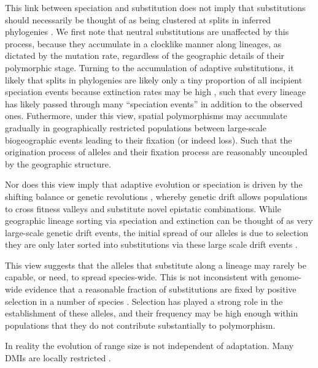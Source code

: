 \documentclass{article}
\begin{document}
This link between speciation and substitution does not imply that
substitutions should necessarily be thought of as being clustered at splits in inferred phylogenies 
\citep[see ][for a recent exhange on this]{Pennell:14,Venditti:14,Pennell:14B}. 
We first note that neutral substitutions are unaffected by this process, 
because they accumulate in a clocklike manner along lineages, 
as dictated by the mutation rate, 
regardless of the geographic details of their polymorphic stage. 
Turning to the accumulation of adaptive substitutions, 
it likely that splits in phylogenies are likely only a tiny proportion of all incipient
speciation events because extinction rates may be high
\citep{Rosenblum:12}, such that every lineage has likely passed through
many ``speciation events'' in addition to the observed ones.
Futhermore, under this view, 
spatial polymorphisms may accumulate gradually in geographically restricted populations
between large-scale 
biogeographic events leading to their fixation (or indeed loss). 
Such that the origination process of alleles and their fixation process
are reasonably uncoupled \citep[in the sense of ][]{Gillespie:94} by the geographic structure.

 
Nor does this view imply that adaptive evolution or speciation is driven by the
shifting balance or genetic revolutions 
\citep{Wright:32, Mayr-genetic-revol:1954}, 
whereby genetic drift allows
populations to cross fitness valleys and substitute novel epistatic
combinations. While geographic lineage sorting via speciation and
extinction can be thought of as very large-scale genetic drift events,
the initial spread of our alleles is due to selection they are only later sorted 
into substitutions via these large scale drift events \citep[see also
][for discussion]{Futuyma:89}. 

This view suggests that the alleles that substitute along a lineage
may rarely be capable, or need, to spread species-wide. This is not
inconsistent with genome-wide evidence that a reasonable fraction of 
substitutions are fixed by positive selection in a number of species
\citep[most notably Drosophila][]{}. Selection has played a strong
role in the establishment of these alleles, and their frequency may be
high enough within populations that they do not contribute
substantially to polymorphism.

In reality the evolution of range size is not independent of
adaptation. Many DMIs are locally restricted \citep{Cutter:12}.
\end{document}
